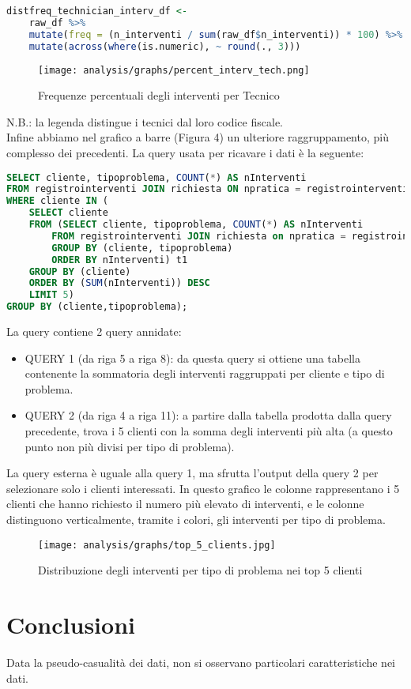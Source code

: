\documentclass{article}
\begin{document}
\begin{lstlisting}[language=R]
distfreq_technician_interv_df <-
    raw_df %>%
    mutate(freq = (n_interventi / sum(raw_df$n_interventi)) * 100) %>%
    mutate(across(where(is.numeric), ~ round(., 3)))
\end{lstlisting}
\begin{figure}[h!]
    \texttt{[image: analysis/graphs/percent\_interv\_tech.png]}
    \label{fig:data_analysis4}
    \caption{Frequenze percentuali degli interventi per Tecnico}
\end{figure}
N.B.: la legenda distingue i tecnici dal loro codice fiscale.\\
Infine abbiamo nel grafico a barre (Figura 4) un ulteriore raggruppamento, più complesso dei precedenti.
La query usata per ricavare i dati è la seguente:
\begin{lstlisting}[language=SQL]
SELECT cliente, tipoproblema, COUNT(*) AS nInterventi 
FROM registrointerventi JOIN richiesta ON npratica = registrointerventi.richiesta
WHERE cliente IN (
    SELECT cliente
    FROM (SELECT cliente, tipoproblema, COUNT(*) AS nInterventi 
        FROM registrointerventi JOIN richiesta on npratica = registrointerventi.richiesta
        GROUP BY (cliente, tipoproblema)
        ORDER BY nInterventi) t1
    GROUP BY (cliente)
    ORDER BY (SUM(nInterventi)) DESC
    LIMIT 5)
GROUP BY (cliente,tipoproblema);
\end{lstlisting}
La query contiene 2 query annidate:
\begin{itemize}
    \item QUERY 1 (da riga 5 a riga 8): da questa query si ottiene una tabella contenente la sommatoria degli interventi raggruppati per cliente e tipo di problema.
    \item QUERY 2 (da riga 4 a riga 11): a partire dalla tabella prodotta dalla query precedente, trova i 5 clienti con la somma degli interventi più alta (a questo punto non più divisi per tipo di problema).
\end{itemize}
La query esterna è uguale alla query 1, ma sfrutta l'output della query 2 per selezionare solo i clienti interessati. In questo grafico le colonne rappresentano i 5 clienti che hanno richiesto il numero più elevato di interventi, e le colonne distinguono verticalmente, tramite i colori, gli interventi per tipo di problema.
\begin{figure}[h!]
    \centering
    \texttt{[image: analysis/graphs/top\_5\_clients.jpg]}
    \label{fig:data_analysis5}
    \caption{Distribuzione degli interventi per tipo di problema nei top 5 clienti}
\end{figure}

\section{Conclusioni}
Data la pseudo-casualità dei dati, non si osservano particolari caratteristiche nei dati.
\end{document}
